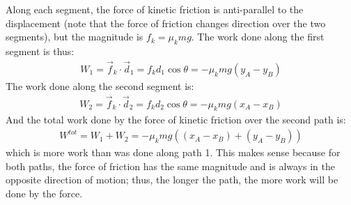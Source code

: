\begin{example}
Along each segment, the force of kinetic friction is anti-parallel to the displacement (note that the force of friction changes direction over the two segments), but the magnitude is $f_k=\mu_kmg$. The work done along the first segment is thus:
\begin{align*}
W_1 = \vec f_k \cdot \vec d_1 = f_k d_1 \cos\theta = -\mu_k mg(y_A-y_B)
\end{align*}
The work done along the second segment is:
\begin{align*}
W_2 = \vec f_k \cdot \vec d_2 = f_k d_2 \cos\theta = -\mu_k mg(x_A-x_B)
\end{align*}
And the total work done by the force of kinetic friction over the second path is:
\begin{align*}
W^{tot} = W_1 + W_2 = -\mu_k mg \left((x_A-x_B) + (y_A-y_B)\right)
\end{align*}
which is more work than was done along path 1. This makes sense because for both paths, the force of friction has the same magnitude and is always in the opposite direction of motion; thus, the longer the path, the more work will be done by the force.
\end{example}

